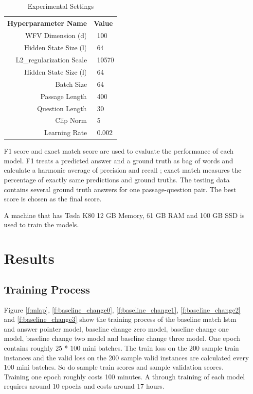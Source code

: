 \documentclass[modernstyle,12pt]{sjsuthesis}
\theoremstyle{definition}
\begin{document}
\begin{table}[htbp]\centering
  \caption{Experimental Settings}
  \label{tab:settings}
  \begin{tabular}{|r|l|} \hline
    Hyperparameter Name& Value \\ \hline\hline
    WFV Dimension (d) & \ 100 \\
    Hidden State Size (l) & \ 64 \\
    L2\_regularization Scale & \ 10570\\
    Hidden State Size (l) & \ 64\\
    Batch Size & \ 64\\
    Passage Length & \ 400\\
    Question Length & \ 30\\
    Clip Norm & \ 5\\
    Learning Rate & \ 0.002 \\ \hline
  \end{tabular}
\end{table}

F1 score and exact match score are used to evaluate the performance of each model. F1 treats a predicted answer and a ground truth as bag of words and calculate a harmonic average of precision and recall ; exact match measures the percentage of exactly same predictions and ground truths. The testing data contains several ground truth answers for one passage-question pair. The best score is chosen as the final score.

A machine that has Tesla K80 12 GB Memory, 61 GB RAM and 100 GB SSD is used to train the models.

\section{Results}
\subsection{Training Process}

Figure \ref{f:mlap}, \ref{f:baseline_change0}, \ref{f:baseline_change1}, \ref{f:baseline_change2} and \ref{f:baseline_change3} show the training process of the baseline match lstm and answer pointer model, baseline change zero model, baseline change one model, baseline change two model and  baseline change three model. One epoch contains roughly 25 * 100 mini batches. The train loss on the 200 sample train instances and the valid loss on the 200 sample valid instances are calculated every 100 mini batches. So do sample train scores and sample validation scores. Training one epoch roughly costs 100 minutes. A through training of each model requires around 10 epochs and costs around 17 hours.
\end{document}
